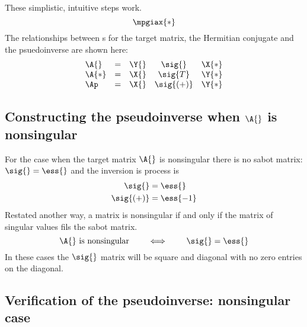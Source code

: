 These simplistic, intuitive steps work. 
\begin{equation}
    \mpgiax{*}
\end{equation}
The relationships between \svdl s for the target matrix, the Hermitian conjugate and the psuedoinverse are shown here:
\begin{equation}
  \begin{array}{lcccc}
    \A{} &=& \Y{} & \sig{} & \X{*} \\
    \A{*} &=& \X{} & \sig{T} & \Y{*} \\
    \Ap &=& \X{} & \sig{(+)} & \Y{*} \\
  \end{array}
\end{equation}

\subsection[Construction: special case]{Constructing the pseudoinverse when $\A{}$ is nonsingular}
For the case when the target matrix $\A{}$ is nonsingular there is no sabot matrix: $\sig{}=\ess{}$ and the inversion is process is
\begin{equation}
  \begin{split}
    \sig{} &= \ess{} \\
    \sig{(+)} &= \ess{-1}
  \end{split}
\end{equation}
Restated another way, a matrix is nonsingular if and only if the matrix of singular values fils the sabot matrix.
\begin{equation}
  \A{} \text{ is nonsingular}\qquad \iff \qquad \sig{}=\ess{}
\end{equation}
In these cases the $\sig{}$ matrix will be square and diagonal with no zero entries on the diagonal.

\subsection[Verification: singular case]{Verification of the pseudoinverse: nonsingular case}

\endinput